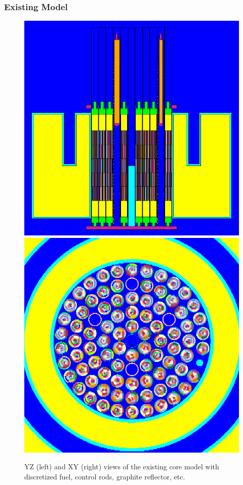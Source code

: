 \documentclass[fleqn]{beamer}
\begin{document}
\begin{frame}
\frametitle{Existing Model}

\begin{figure}
\centering
\includegraphics[width = .5\textwidth]{existingyz}
\includegraphics[width = .5\textwidth]{existingxy}
\caption{YZ (left) and XY (right) views of the existing core model with discretized fuel, control rods, graphite reflector, etc.}
\end{figure}

\end{frame}
\end{document}
